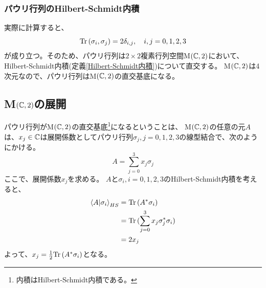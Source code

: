 \subsubsection{パウリ行列のHilbert-Schmidt内積}
実際に計算すると、
$$
  \text{Tr}\,(\sigma_i,\sigma_j) = 2\delta_{i,j},\quad i,j=0,1,2,3
$$
が成り立つ。そのため、パウリ行列は$2\times 2$複素行列空間M$(\mathbb{C},2)$において、Hilbert-Schmidt内積(定義\ref{Hilbert-Schmidt内積})について直交する。
M$(\mathbb{C},2)$は4次元なので、パウリ行列はM$(\mathbb{C},2)$の直交基底になる。

\subsection{M$(\mathbb{C},2)$の展開} \label{sec:MC2}
パウリ行列がM$(\mathbb{C},2)$の直交基底\footnote{内積はHilbert-Schmidt内積である。}になるということは、
M$(\mathbb{C},2)$の任意の元$A$は、$x_j\in\mathbb{C}$は展開係数としてパウリ行列$\sigma_j,j=0,1,2,3$の線型結合で、次のようにかける。
$$
  A = \sum_{j=0}^3 x_j\sigma_j
$$
ここで、展開係数$x_j$を求める。
$A$と$\sigma_i,i=0,1,2,3$のHilbert-Schmidt内積を考えると、
\begin{align}
  \braket{A|\sigma_i}_{HS} &= \text{Tr}\,(A^*\sigma_i) \\
  &= \text{Tr}\,(\sum_{j=0}^3x_j\sigma_j^*\sigma_i) \\
  &= 2x_j
\end{align}
よって、$x_j = \frac{1}{2}\text{Tr}\,(A^*\sigma_i)$となる。
